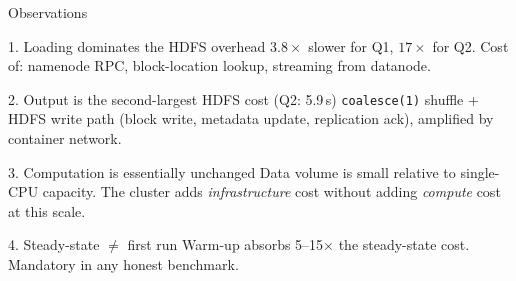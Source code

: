 \documentclass[aspectratio=169]{beamer}
\begin{document}
\begin{frame}{Observations}
\begin{block}{1. Loading dominates the HDFS overhead}
$3.8\times$ slower for Q1, $17\times$ for Q2. Cost of:
namenode RPC, block-location lookup, streaming from datanode.
\end{block}

\begin{block}{2. Output is the second-largest HDFS cost (Q2: 5.9\,s)}
\texttt{coalesce(1)} shuffle + HDFS write path (block write,
metadata update, replication ack), amplified by container network.
\end{block}

\begin{block}{3. Computation is essentially unchanged}
Data volume is small relative to single-CPU capacity. The cluster
adds \emph{infrastructure} cost without adding \emph{compute} cost
at this scale.
\end{block}

\begin{block}{4. Steady-state $\neq$ first run}
Warm-up absorbs 5--15$\times$ the steady-state cost.
Mandatory in any honest benchmark.
\end{block}

\end{frame}

\end{document}
